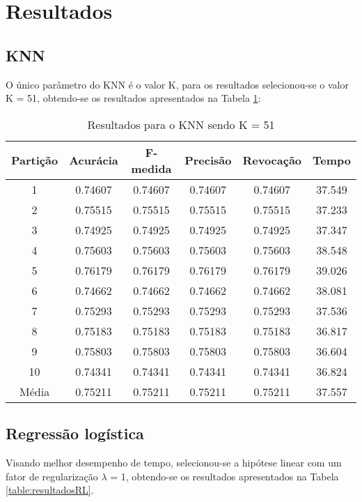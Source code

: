 \section{Resultados}

\subsection{KNN}

O único parâmetro do KNN é o valor K, para os resultados selecionou-se o valor K = 51, obtendo-se os resultados apresentados na Tabela \ref{table:resultadosKNN}:

\begin{table}[h]
\centering
\caption{Resultados para o KNN sendo K = 51}
\vspace{0.2cm}
\begin{tabular}{c|c|c|c|c|c}
Partição & Acurácia & F-medida & Precisão & Revocação & Tempo \\
\hline
1  & 0.74607 & 0.74607 & 0.74607 & 0.74607 & 37.549 \\
2  & 0.75515 & 0.75515 & 0.75515 & 0.75515 & 37.233 \\
3  & 0.74925 & 0.74925 & 0.74925 & 0.74925 & 37.347 \\
4  & 0.75603 & 0.75603 & 0.75603 & 0.75603 & 38.548 \\
5  & 0.76179 & 0.76179 & 0.76179 & 0.76179 & 39.026 \\
6  & 0.74662 & 0.74662 & 0.74662 & 0.74662 & 38.081 \\
7  & 0.75293 & 0.75293 & 0.75293 & 0.75293 & 37.536 \\
8  & 0.75183 & 0.75183 & 0.75183 & 0.75183 & 36.817 \\
9  & 0.75803 & 0.75803 & 0.75803 & 0.75803 & 36.604 \\
10 & 0.74341 & 0.74341 & 0.74341 & 0.74341 & 36.824 \\
\hline
Média & 0.75211 & 0.75211 & 0.75211 & 0.75211 & 37.557

\end{tabular} 
\label{table:resultadosKNN}
\end{table}

\subsection{Regressão logística}

Visando melhor desempenho de tempo, selecionou-se a hipótese linear com um fator de regularização \(\lambda\)  = 1, obtendo-se os resultados apresentados na Tabela \ref{table:resultadosRL}.


